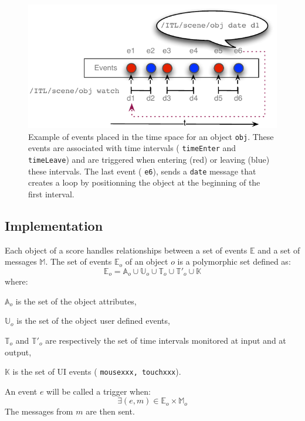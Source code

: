 \documentclass{article}
\newcommand{\OSC}[1]	{{\fontsize{8.5pt}{8pt} \selectfont\texttt{#1}}}
\let\olditemize\itemize
\let\oldenditemize\enditemize
\renewenvironment{itemize} 	{\olditemize \renewcommand{\labelitemi}{$\bullet$} \setlength{\itemsep}{0mm}}{\oldenditemize}
\begin{document}
\begin{figure}[h]
   \centering
   \includegraphics[width=0.95\columnwidth]{imgs/events}
   \caption{Example of events placed in the time space for an object \OSC{obj}. These events are associated with time intervals (\OSC{timeEnter} and \OSC{timeLeave}) and are triggered when entering (red) or leaving (blue) these intervals. The last event (\OSC{e6}), sends a \OSC{date} message that creates a loop by positionning the object at the beginning of the first interval.}
   \label{fig:events}
\end{figure}


\subsection{Implementation}

Each object of a score handles relationships between a set of events $\mathbb{E}$ and a set of messages $\mathbb{M}$. The set of events $\mathbb{E}_o$ of an object $o$ is a polymorphic set defined as:
\[
	\mathbb{E}_o = \mathbb{A}_o \cup \mathbb{U}_o \cup \mathbb{T}_o \cup \mathbb{T'}_o \cup \mathbb{K}  
\] 
where:
\begin{itemize}
\item[-] $\mathbb{A}_o$ is the set of the object attributes, 
\item[-] $\mathbb{U}_o$ is the set of the object user defined events, 
\item[-] $\mathbb{T}_o$ and $\mathbb{T'}_o$ are respectively the set of time intervals monitored at input and at output,
\item[-] $\mathbb{K}$ is the set of UI events (\OSC{mousexxx, touchxxx}).
\end{itemize}

An event $e$ will be called a trigger when:
\[
	\exists (e, m) \in \mathbb{E}_o \times \mathbb{M}_o  
\] 
The messages from $m$ are then sent.
\end{document}
